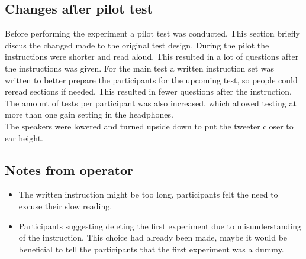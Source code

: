 \subsection{Changes after pilot test}
Before performing the experiment a pilot test was conducted. This section briefly discus the changed made to the original test design. 
During the pilot the instructions were shorter and read aloud. This resulted in a lot of questions after the instructions was given. For the main test a written instruction set was written to better prepare the participants for the upcoming test, so people could reread sections if needed. This resulted in fewer questions after the instruction. \\
The amount of tests per participant was also increased, which allowed testing at more than one gain setting in the headphones. \\
The speakers were lowered and turned upside down to put the tweeter closer to ear height. 

\subsection{Notes from operator}
\begin{itemize}
\item The written instruction might be too long, participants felt the need to excuse their slow reading.
\item Participants suggesting deleting the first experiment due to misunderstanding of the instruction. This choice had already been made, maybe it would be beneficial to tell the participants that the first experiment was a dummy. 
\end{itemize}

